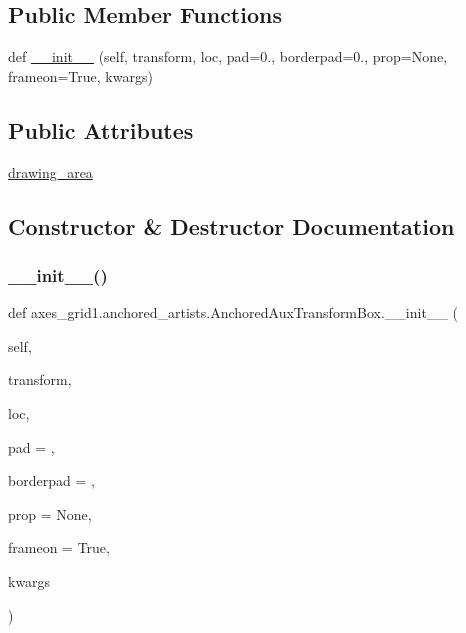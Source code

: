 \subsection*{Public Member Functions}
\begin{DoxyCompactItemize}
\item 
def \hyperlink{classaxes__grid1_1_1anchored__artists_1_1AnchoredAuxTransformBox_a66382708af8cdafd8675f1f3eea78fad}{\+\_\+\+\_\+init\+\_\+\+\_\+} (self, transform, loc, pad=0., borderpad=0., prop=None, frameon=True, kwargs)
\end{DoxyCompactItemize}
\subsection*{Public Attributes}
\begin{DoxyCompactItemize}
\item 
\hyperlink{classaxes__grid1_1_1anchored__artists_1_1AnchoredAuxTransformBox_adb2f663ce6e8605acb3ebb045e6799e1}{drawing\+\_\+area}
\end{DoxyCompactItemize}


\subsection{Constructor \& Destructor Documentation}
\mbox{\label{classaxes__grid1_1_1anchored__artists_1_1AnchoredAuxTransformBox_a66382708af8cdafd8675f1f3eea78fad}} 
\subsubsection{\texorpdfstring{\+\_\+\+\_\+init\+\_\+\+\_\+()}{\_\_init\_\_()}}
{\footnotesize\ttfamily def axes\+\_\+grid1.\+anchored\+\_\+artists.\+Anchored\+Aux\+Transform\+Box.\+\_\+\+\_\+init\+\_\+\+\_\+ (\begin{DoxyParamCaption}\item[{}]{self,  }\item[{}]{transform,  }\item[{}]{loc,  }\item[{}]{pad = {},  }\item[{}]{borderpad = {},  }\item[{}]{prop = {\ttfamily None},  }\item[{}]{frameon = {\ttfamily True},  }\item[{}]{kwargs }\end{DoxyParamCaption})}

